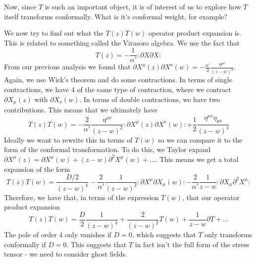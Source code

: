 \documentclass[11pt, oneside]{article}   	%
\theoremstyle{slanted}
\begin{document}
Now, since $ T $ is such an important 
object, it is of interest of us 
to explore how $ T $ itself transforms 
conformally. What is it's conformal weight, for example? 

We now try to find out what the 
$ T \left( z  \right)  T \left(  w  \right)  $ operator product expansion is. 
This is related to something called the Virasoro algebra. 
We use the fact that 
\[
 T \left( z  \right)   = - \frac{1}{\alpha' } : \partial  X \partial  X :
\] From our previous analysis we found 
that $ \partial X ^ \mu \left(  z  \right)  \partial  X ^ \nu \left(  w  \right)   = 
- \frac{\alpha ' }{ 2 } \frac{\eta ^{ \mu \nu } }{ \left( z -  w  \right)  ^{ 2 } } $. 
Again, we use Wick's theorem 
and do some contractions. In terms 
of single contractions, we have 4 of the same type of contraction, 
where we contract $ \partial  X _ \mu \left( z \right) $ with $ \partial  X _ \nu 
\left( w  \right)  $. In terms of double contractions, 
we have two contributions. This 
means that we ultimately have 
\[
	T \left( z  \right)  T \left( w  \right)  
	= -\frac{2}{\alpha ' } \frac{\eta ^{ \mu \nu } }{ \left( z - w  \right)  ^ 2 } 
	: \partial  X ^ \mu \left(  z  \right)  \partial  X ^ \nu \left(  w  \right)  : 
	+ \frac{1}{2 } \frac{\eta ^{ \mu \nu } \eta _{ \mu \nu } }{\left( z  - w  \right)  ^ 4 }
\] Ideally we want to rewrite this in terms 
of $ T \left( w  \right)   $ so we 
can compare it to the form of the conformal transformation. 
To do this, we Taylor expand $ \partial  X ^ \mu \left(  z \right)  
= \partial  X ^ \mu \left( w   \right)  + \left( z - w  \right)  \partial  ^ 2 X ^ \mu 
\left( w  \right)  + \dots $. 
This means we get a total expansion of 
the form 
\[
	T \left( z  \right)  T \left( w  \right)   = 
	\frac{D  / 2 }{ \left( z - w  \right)  ^{ 4 }  }  - \frac{2}{\alpha ' } \frac{1}{\left( z- w  \right)  ^ 2 } 
	: \partial  X ^ \mu \partial  X _ \mu \left( w  \right)  :  - \frac{2}{\alpha ' } 
	\frac{1}{z - w } : \partial  X _ \mu \partial  ^  2 X ^ \mu : 
\] Therefore, we have 
that, in terms of the 
expression $ T \left( w  \right)  $, 
that our operator product expansion 
\[
	T \left( z  \right)  T \left( w  \right)  
	= \frac{D}{2 } \frac{1}{\left( z - w  \right)  ^{ 4 } } + 
	\frac{2}{\left( z - w  \right) ^ 2  } T \left(  w \right)  
	+ \frac{1}{z - w  } \partial  T + \dots 
\]  The pole 
of order 4 only vanishes if $ D = 0 $, which 
suggests that $ T $ only transforms conformally if $ D  =0 $. 
This suggests that $ T $ in fact isn't 
the full form of the stress tensor - we need to consider 
ghost fields. 
\end{document}
